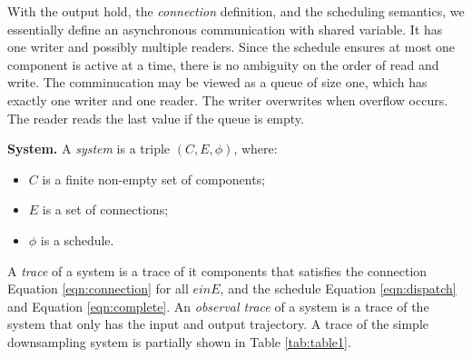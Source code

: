 With the output hold, the \emph{connection} definition, and the scheduling semantics, we essentially define an asynchronous communication with shared variable. It has one writer and possibly multiple readers. Since the schedule ensures at most one component is active at a time, there is no ambiguity on the order of read and write. The comminucation may be viewed as a queue of size one, which has exactly one writer and one reader. The writer overwrites when overflow occurs. The reader reads the last value if the queue is empty.

{\bf System.}
A \emph{system} is a triple $(C, E, \phi)$, where:
\begin{itemize}
    	\item $C$ is a finite non-empty set of components;
    	\item $E$ is a set of connections;
    	\item $\phi$ is a schedule.
\end{itemize}
A \emph{trace} of a system is a trace of it components that satisfies the connection Equation \ref{eqn:connection} for all $e in E$, and the schedule Equation \ref{eqn:dispatch} and Equation \ref{eqn:complete}.
An \emph{observal trace} of a system is a trace of the system that only has the input and output trajectory.
A trace of the simple downsampling system is partially shown in Table \ref{tab:table1}.


